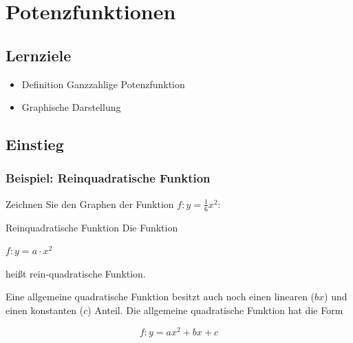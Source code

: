 \section{Potenzfunktionen}

\subsection*{Lernziele}

\begin{itemize}
\item Definition Ganzzahlige Potenzfunktion
\item Graphische Darstellung
\end{itemize}
\newpage


\subsection{Einstieg}
\subsubsection{Beispiel: Reinquadratische Funktion}

Zeichnen Sie den Graphen der Funktion $f: y= \frac16 x^2$:


\begin{definition}{Reinquadratische Funktion}{}
Die Funktion

$f: y = a\cdot{}x^2$

heißt rein-quadratische Funktion.
\end{definition}


\begin{bemerkung}{}{}
Eine allgemeine quadratische Funktion besitzt auch noch einen linearen ($bx$) und einen konstanten ($c$) Anteil. Die allgemeine quadratische Funktion hat die Form

$$f: y= ax^2 + bx + c$$
\end{bemerkung}




